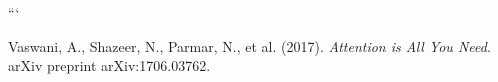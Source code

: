 \documentclass[11pt]{article}
\theoremstyle{definition}
\begin{document}






















































```








































Vaswani, A., Shazeer, N., Parmar, N., et al. (2017). \emph{Attention is All You Need}. arXiv preprint arXiv:1706.03762.
\end{document}
